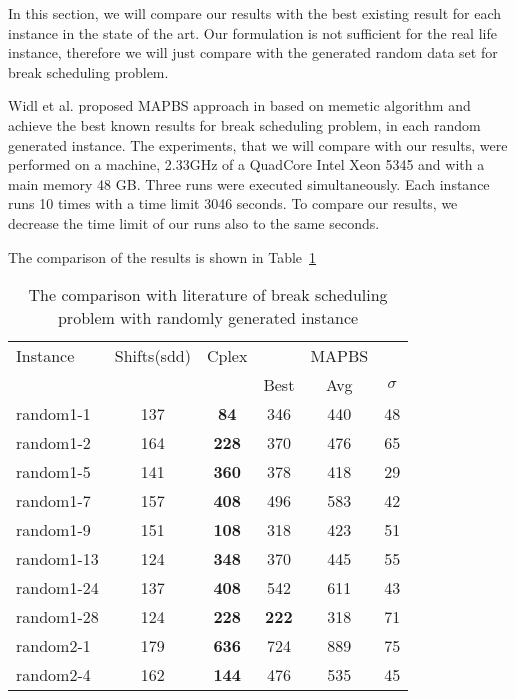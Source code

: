 In this section, we will compare  our results with the best existing result for each instance in the state of the art. Our formulation is not sufficient for the real life instance, therefore we will just compare with the generated random data set for break scheduling problem. 

Widl et al. proposed MAPBS approach in \cite{li:2014:widl} \cite{li:2010:widl} \cite{li:2010:widlimp} based on memetic algorithm and achieve the best known results for break scheduling problem, in each random generated instance. The experiments, that we will compare with our results, were performed on a machine, 2.33GHz of a QuadCore Intel Xeon 5345 and with a main memory 48 GB. Three runs were executed simultaneously. Each instance runs 10 times with a time limit 3046 seconds. To compare our results, we decrease the time limit of our runs also to the same seconds. 

The comparison of the results is shown in  Table~\ref{tbl:breakcomparison}






\begin{table} \small
\centering
\begin{tabular}{lccccc}
\hline
 Instance &  Shifts(sdd) & Cplex & &  MAPBS \cite{li:2014:widl} \\

 & & &  Best & Avg & $\sigma$ \\

random1-1  & 137 & \textbf{84}	 & 	346	&	440	& 48	\\
random1-2  & 164 & \textbf{228} 	& 	370	&	476	& 65	\\
random1-5  & 141 & \textbf{360} 	&	378	&	418	& 29	\\	
random1-7  & 157 & \textbf{408}	&	496	&	583 	& 42	\\
random1-9  & 151 & \textbf{108}	&	318	&	423	& 51	\\
random1-13 & 124 & \textbf{348}	&	370	&	445	& 55	\\
random1-24 & 137 & \textbf{408}	&	542	&	611	& 43	\\
random1-28 & 124 & \textbf{228}	&	\textbf{222}	&	318	& 71	\\	
random2-1   & 179 & \textbf{636}	&	724	&	889	&  75	\\
random2-4   & 162 & \textbf{144}	&	476	&	535 	& 45	\\

\hline
\end{tabular}
\caption{The comparison with literature of break scheduling problem with randomly generated instance}
\label{tbl:breakcomparison}
\end{table}


